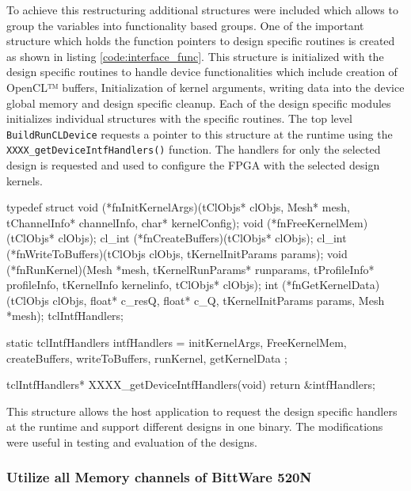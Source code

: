 
To achieve this restructuring additional structures were included which allows to
group the variables into functionality based groups. One of the important structure
which holds the function pointers to design specific routines is created
as shown in listing \ref{code:interface_func}. This structure is initialized
with the design specific routines to handle device functionalities which
include creation of OpenCL™ buffers, Initialization of kernel arguments,
writing data into the device global memory and design specific cleanup.
Each of the design specific modules initializes individual structures
with the specific routines. The top level \texttt{BuildRunCLDevice} requests
a pointer to this structure at the runtime using the \texttt{XXXX\_getDeviceIntfHandlers()}
function. The handlers for only the selected design is requested and used to configure the
FPGA with the selected design kernels.
\begin{CppCode}[caption=Structure to hold the design specific interface function pointers
    and initialization example, frame=tlrb, label=code:interface_func]
typedef struct
{
    void (*fnInitKernelArgs)(tClObjs* clObjs, Mesh* mesh, tChannelInfo* channelInfo,
                             char* kernelConfig);
    void (*fnFreeKernelMem)(tClObjs* clObjs);
    cl_int (*fnCreateBuffers)(tClObjs* clObjs);
    cl_int (*fnWriteToBuffers)(tClObjs clObjs, tKernelInitParams params);
    void (*fnRunKernel)(Mesh *mesh, tKernelRunParams* runparams, tProfileInfo* profileInfo,
                        tKernelInfo kernelinfo, tClObjs* clObjs);
    int (*fnGetKernelData)(tClObjs clObjs, float* c_resQ, float* c_Q,
                           tKernelInitParams params, Mesh *mesh);
} tclIntfHandlers;

static tclIntfHandlers intfHandlers =
{
    initKernelArgs,
    FreeKernelMem,
    createBuffers,
    writeToBuffers,
    runKernel,
    getKernelData
};

tclIntfHandlers* XXXX_getDeviceIntfHandlers(void)
{
    return &intfHandlers;
}
\end{CppCode}

This structure allows the host application to request the design specific handlers at the
runtime and support different designs in one binary. The modifications were useful in testing
and evaluation of the designs.

\subsubsection*{Utilize all Memory channels of BittWare 520N}

